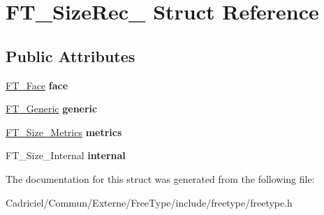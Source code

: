 \hypertarget{struct_f_t___size_rec__}{\section{F\-T\-\_\-\-Size\-Rec\-\_\- Struct Reference}
\label{struct_f_t___size_rec__}
}
\subsection*{Public Attributes}
\begin{DoxyCompactItemize}
\item 
\hypertarget{struct_f_t___size_rec___a21b54fb07feaba8be23321054da98f5f}{\hyperlink{struct_f_t___face_rec__}{F\-T\-\_\-\-Face} {\bfseries face}}\label{struct_f_t___size_rec___a21b54fb07feaba8be23321054da98f5f}

\item 
\hypertarget{struct_f_t___size_rec___aa24520b093a9b4ba9ff388bfe7b9491d}{\hyperlink{struct_f_t___generic__}{F\-T\-\_\-\-Generic} {\bfseries generic}}\label{struct_f_t___size_rec___aa24520b093a9b4ba9ff388bfe7b9491d}

\item 
\hypertarget{struct_f_t___size_rec___a29a6b518d09f6cf1714d9aed01eddc01}{\hyperlink{struct_f_t___size___metrics__}{F\-T\-\_\-\-Size\-\_\-\-Metrics} {\bfseries metrics}}\label{struct_f_t___size_rec___a29a6b518d09f6cf1714d9aed01eddc01}

\item 
\hypertarget{struct_f_t___size_rec___a236c47ea3138e485c29b0d7baa5cf3b6}{F\-T\-\_\-\-Size\-\_\-\-Internal {\bfseries internal}}\label{struct_f_t___size_rec___a236c47ea3138e485c29b0d7baa5cf3b6}

\end{DoxyCompactItemize}


The documentation for this struct was generated from the following file\-:\begin{DoxyCompactItemize}
\item 
Cadriciel/\-Commun/\-Externe/\-Free\-Type/include/freetype/freetype.\-h\end{DoxyCompactItemize}
